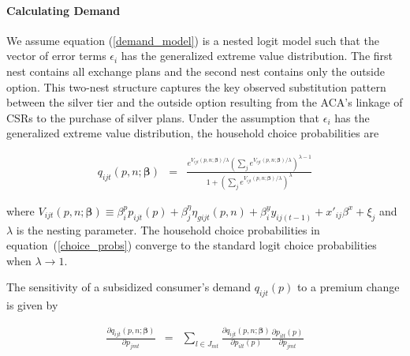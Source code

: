 \documentclass[12pt]{article}
\begin{document}
		
\paragraph{Calculating Demand}


 We assume equation (\ref{demand_model}) is a nested logit model such that the vector of error terms $\epsilon_i$ has the generalized extreme value distribution.  The first nest contains all exchange plans and  the second nest contains only the outside option.  This two-nest structure captures the key observed substitution pattern between the silver tier and the outside option resulting from the ACA's linkage of CSRs to the purchase of silver plans.  Under the assumption that $\epsilon_i$ has the generalized extreme value distribution, the household choice probabilities are 

	\vspace{-0.4in}		

	\begin{eqnarray}\label{choice_probs}
	q_{ijt}(\textit{p},\textit{n};\boldsymbol{\beta}) &=&  \frac{e^{V_{ijt}(\textit{p},\textit{n};\boldsymbol{\beta})/\lambda}\left(\sum_{j } e^{V_{ijt}(\textit{p},\textit{n};\boldsymbol{\beta})/\lambda}\right)^{\lambda-1}}{1 + \left(\sum_{j} e^{V_{ijt}(\textit{p},\textit{n};\boldsymbol{\beta})/\lambda}\right)^{\lambda}} 
	\end{eqnarray}

	\vspace{-0.1in}		


\noindent where $V_{ijt}(\textit{p},\textit{n};\boldsymbol{\beta}) \equiv \beta_{i}^p p_{ijt}(\textit{p}) + \beta_j^{\eta} \eta_{gijt}(\textit{p},\textit{n})   + \beta_i^y y_{ij(t-1)} + x'_{ij}\beta^x + \xi_{j}$ and $\lambda$ is the nesting parameter. The household choice probabilities in equation~(\ref{choice_probs}) converge to the standard logit choice probabilities when $\lambda \rightarrow 1$.


The sensitivity of a subsidized consumer's demand $q_{ijt}(\textit{p})$ to a premium change is given by  

	\vspace{-0.4in}

	\begin{eqnarray*}
	\frac{\partial q_{ijt}(\textit{p},\textit{n};\boldsymbol{\beta})}{\partial p_{jmt}} &=& \sum_{l \in J_{mt}} \frac{ \partial q_{ijt}(\textit{p},\textit{n};\boldsymbol{\beta})}{\partial p_{ilt}(\textit{p})}\frac{ \partial p_{ilt}(\textit{p})}{\partial p_{jmt}}
	\end{eqnarray*}
\end{document}
